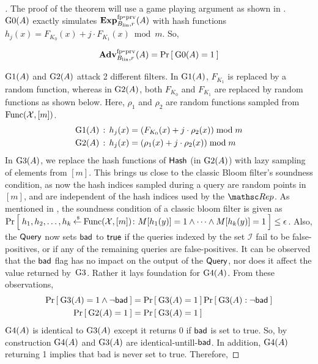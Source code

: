 \begin{proof}[]
The proof of the theorem will use a game playing argument as shown in . $\text{G0}(A)$ exactly simulates $\mathrm{\mathbf{Exp}}^{\mathrm{fp\mbox{-}prv}}_{B_\mathrm{lin},r}(A)$ with hash functions $h_j(x) =  F_{K_0}(x) + j\cdot F_{K_1}(x) \bmod m$. So,

\begin{equation}
\mathrm{\mathbf{Adv}}^{\mathrm{fp\mbox{-}prv}}_{B_{\mathrm{lin}},r}(A) = \Pr\left[\: \text{G0}(A)=1 \:\right]\label{eq:0}
\end{equation}

$\text{G1}(A)$ and $\text{G2}(A)$ attack 2 different filters. In $\text{G1}(A)$, $F_{K_1}$ is replaced by a random function, whereas in $\text{G2}(A)$, both $F_{K_0}$ and $F_{K_1}$ are replaced by random functions as shown below. Here, $\rho_1$ and $\rho_2$ are random functions sampled from $\mathrm{Func}({\cal X},[m])$.
\begin{align*}
\text{G1}(A)\, : \, h_j(x) &= ( F_{K_0}(x) + j\cdot \rho_2(x)) \bmod m\\
\text{G2}(A)\, : \, h_j(x) &= ( \rho_1(x) + j \cdot \rho_2(x)) \bmod m
\end{align*}
In $\text{G3}(A)$, we replace the hash functions of $\mathsf{Hash}$ (in $\text{G2}(A)$) with lazy sampling of elements from $[m]$. This brings us close to the classic Bloom filter's soundness condition, as now the hash indices sampled during a query are random points in $[m]$, and are independent of the hash indices used by the $\Rep$. As mentioned in , the soundness condition of a classic bloom filter is given as  $\Pr\left[\: h_1,h_2,\ldots,h_k {\:\stackrel{{\scriptscriptstyle \hspace{0.2em}\$}} {\leftarrow}\:} \mathrm{Func}({\cal X},[m])\colon M[h_1(y)]=1 \wedge \cdots \wedge M[h_k(y)]=1 \:\right] \leq \epsilon$. Also, the $\mathsf{Query}$ now sets $\mathsf{bad}$ to $\mathsf{true}$ if the queries indexed by the set $\mathcal{I}$ fail to be false-positives, or if any of the remaining queries are false-positives. It can be observed that the $\mathsf{bad}$ flag has no impact on the output of the $\mathsf{Query}$, nor does it affect  the value returned by~$\text{G3}$. Rather it lays foundation for $\text{G4}(A)$. From these observations, 
	\begin{align}
	\Pr\left[\: \text{G3}(A)=1 \wedge \neg\mathsf{bad} \:\right] &= \Pr\left[\: \text{G3}(A)=1 \:\right] \Pr\left[\: \text{G3}(A) : \neg\mathsf{bad} \:\right]\label{eq:1} \\
	\Pr\left[\: \text{G2}(A)=1 \:\right] &= \Pr\left[\: \text{G3}(A)=1 \:\right]\label{eq:2}
	\end{align}
$\text{G4}(A)$ is identical to $\text{G3}(A)$ except it returns 0 if $\mathsf{bad}$ is set to true. So, by construction $\text{G4}(A)$ and $\text{G3}(A)$ are identical-untill-$\mathsf{bad}$. In addition, $\text{G4}(A)$ returning 1 implies that bad is never set to true. Therefore,

\end{proof}

